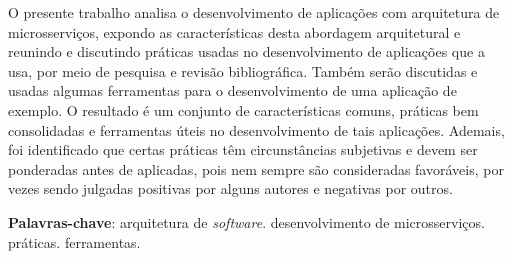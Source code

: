 \setlength{\absparsep}{18pt} %
\begin{resumo}

O presente trabalho analisa o desenvolvimento de aplicações com arquitetura de microsserviços, expondo as características desta abordagem arquitetural e reunindo e discutindo práticas usadas no desenvolvimento de aplicações que a usa, por meio de pesquisa e revisão bibliográfica. Também serão discutidas e usadas algumas ferramentas para o desenvolvimento de uma aplicação de exemplo. O resultado é um conjunto de características comuns, práticas bem consolidadas e ferramentas úteis no desenvolvimento de tais aplicações. Ademais, foi identificado que certas práticas têm circunstâncias subjetivas e devem ser ponderadas antes de aplicadas, pois nem sempre são consideradas favoráveis, por vezes sendo julgadas positivas por alguns autores e negativas por outros.



 \textbf{Palavras-chave}: arquitetura de \emph{software}. desenvolvimento de microsserviços. práticas. ferramentas.
\end{resumo}